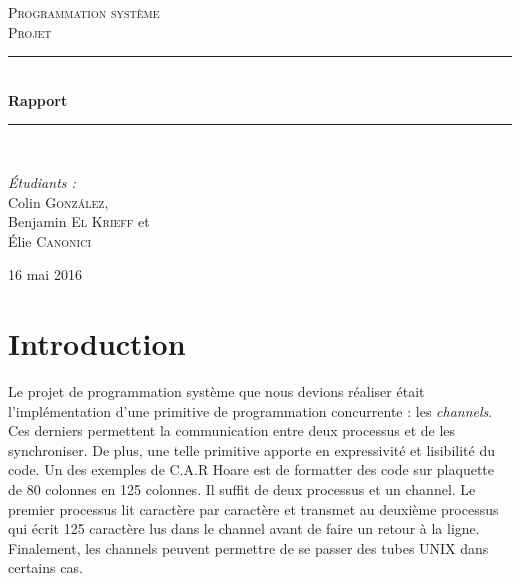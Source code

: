 \documentclass[a4paper]{report}
\newcommand{\HRule}{\rule{\linewidth}{0.5mm}}
\begin{document}
\begin{titlepage}
\begin{center}
	\textsc{\LARGE Programmation système}\\[1.5cm]
	\textsc{\Large Projet}\\[0.5cm]
	\HRule \\[0.4cm]
	{\huge \bfseries Rapport \\[0.4cm]}
	\HRule \\[1.5cm]
	\noindent
	\begin{minipage}{0.4\textwidth}
		\emph{Étudiants : } \\ Colin \textsc{González}, \\ Benjamin \textsc{El Krieff} et \\ Élie \textsc{Canonici}
	\end{minipage}
	\vfill
	{\large 16 mai 2016}
\end{center}
\end{titlepage}
\setcounter{secnumdepth}{0}
\section{Introduction}
Le projet de programmation système que nous devions réaliser était l'implémentation d'une primitive de programmation concurrente : les \emph{channels}. Ces derniers permettent la communication entre deux processus et de les synchroniser. De plus, une telle primitive apporte en expressivité et lisibilité du code. Un des exemples de C.A.R Hoare est de formatter des code sur plaquette de 80 colonnes en 125 colonnes. Il suffit de deux processus et un channel. Le premier processus lit caractère par caractère et transmet au deuxième processus qui écrit 125 caractère lus dans le channel avant de faire un retour à la ligne. Finalement, les channels peuvent permettre de se passer des tubes UNIX dans certains cas.
\end{document}
